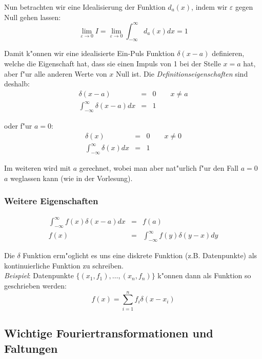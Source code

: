 \documentclass[german, 10pt, a4paper, twocolumn]{scrartcl}
\begin{document}
Nun betrachten wir eine Idealisierung der Funktion $d_a(x)$, indem wir $\varepsilon$ gegen Null gehen lassen:
\begin{displaymath}
	\lim_{\varepsilon \to 0} I = \lim_{\varepsilon \to 0}\int^\infty_{-\infty}d_a(x)dx =1
\end{displaymath}

Damit k"onnen wir eine idealisierte Ein-Puls Funktion $\delta(x-a)$ definieren, welche die Eigenschaft hat, dass sie einen Impuls von 1 bei der Stelle $x=a$ hat, aber f"ur alle anderen Werte von $x$ Null ist. Die \textit{Definitionseigenschaften} sind deshalb:
\begin{eqnarray}
	\delta(x-a) & 					= &	0 \qquad x\neq a \nonumber \\
	\int^\infty_{-\infty}\delta(x-a)dx & 		= &	1 \nonumber
\end{eqnarray}

oder f"ur $a=0$:
\begin{eqnarray}
	\delta(x) & 					= &	0 \qquad x\neq 0 \nonumber \\
	\int^\infty_{-\infty}\delta(x)dx & 		= &	1 \nonumber
\end{eqnarray}

Im weiteren wird mit $a$ gerechnet, wobei man aber nat"urlich f"ur den Fall $a=0$ $a$ weglassen kann (wie in der Vorlesung).\\

\subsubsection{Weitere Eigenschaften}

\begin{eqnarray}
	\int^\infty_{-\infty} f(x) \delta(x-a) dx &	= &		f(a) \nonumber \\
	f(x)&						= &		\int^\infty_{-\infty} f(y)\delta(y-x)dy \nonumber
\end{eqnarray}

Die $\delta$ Funktion erm"oglicht es uns eine diskrete Funktion (z.B. Datenpunkte) als kontinuierliche Funktion zu schreiben.\\

\textit{Beispiel}: Datenpunkte $\{(x_1,f_1), \ldots, (x_n,f_n)\}$ k"onnen dann als Funktion so geschrieben werden:
\begin{displaymath}
	f(x)= \sum^n_{i=1} f_i \delta (x-x_i)
\end{displaymath}

\subsection{Wichtige Fouriertransformationen und Faltungen}
\end{document}
